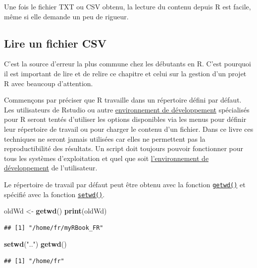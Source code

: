 \documentclass[twoside,symmetric]{book}
\newenvironment{Shaded}{}{}
\newcommand{\KeywordTok}[1]{\textbf{#1}}
\newcommand{\NormalTok}[1]{#1}
\newcommand{\StringTok}[1]{#1}
\begin{document}
Une fois le fichier TXT ou CSV obtenu, la lecture du contenu depuis R est facile, même si elle demande un peu de rigueur.

\hypertarget{l016readCSV}{%
\subsection{Lire un fichier CSV}\label{l016readCSV}}

C'est la source d'erreur la plus commune chez les débutants en R. C'est pourquoi il est important de lire et de relire ce chapitre et celui sur la gestion d'un projet R avec beaucoup d'attention.

Commençons par préciser que R travaille dans un répertoire défini par défaut. Les utilisateurs de Rstudio ou autre \protect\hyperlink{IDE}{environnement de développement} spécialisés pour R seront tentés d'utiliser les options disponibles via les menus pour définir leur répertoire de travail ou pour charger le contenu d'un fichier. Dans ce livre ces techniques ne seront jamais utilisées car elles ne permettent pas la reproductibilité des résultats. Un script doit toujours pouvoir fonctionner pour tous les systèmes d'exploitation et quel que soit \protect\hyperlink{IDE}{l'environnement de développement} de l'utilisateur.

Le répertoire de travail par défaut peut être obtenu avec la fonction \protect\hyperlink{l015getwd}{\texttt{getwd()}} et spécifié avec la fonction \protect\hyperlink{l015setwd}{\texttt{setwd()}}.

\begin{Shaded}
\begin{Highlighting}[]
\NormalTok{oldWd <-}\StringTok{ }\KeywordTok{getwd}\NormalTok{()}
\KeywordTok{print}\NormalTok{(oldWd)}
\end{Highlighting}
\end{Shaded}

\begin{verbatim}
## [1] "/home/fr/myRBook_FR"
\end{verbatim}

\begin{Shaded}
\begin{Highlighting}[]
\KeywordTok{setwd}\NormalTok{(}\StringTok{".."}\NormalTok{)}
\KeywordTok{getwd}\NormalTok{()}
\end{Highlighting}
\end{Shaded}

\begin{verbatim}
## [1] "/home/fr"
\end{verbatim}
\end{document}
